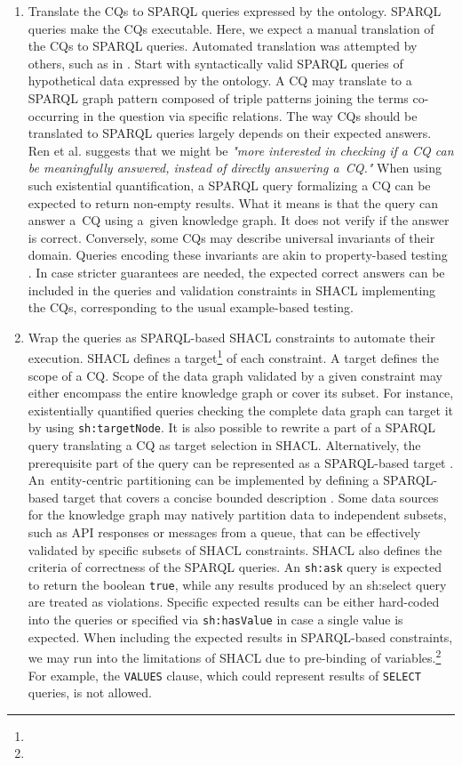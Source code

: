 \documentclass[
]{ceurart}
\begin{document}
\begin{enumerate}
    \item Translate the CQs to SPARQL queries expressed by the ontology. SPARQL queries make the CQs executable. Here, we expect a manual translation of the CQs to SPARQL queries. Automated translation was attempted by others, such as in \cite{EspinozaArias2022}. Start with syntactically valid SPARQL queries of hypothetical data expressed by the ontology. A CQ may translate to a SPARQL graph pattern composed of triple patterns joining the terms co-occurring in the question via specific relations. The way CQs should be translated to SPARQL queries largely depends on their expected answers. Ren et al. \cite{Ren2014} suggests that we might be \textit{"more interested in checking if a CQ can be meaningfully answered, instead of directly answering a~CQ."} When using such existential quantification, a SPARQL query formalizing a CQ can be expected to return non-empty results. What it means is that the query can answer a~CQ using a~given knowledge graph. It does not verify if the answer is correct. Conversely, some CQs may describe universal invariants of their domain. Queries encoding these invariants are akin to property-based testing \cite{Fink1997}. In case stricter guarantees are needed, the expected correct answers can be included in the queries and validation constraints in SHACL implementing the CQs, corresponding to the usual example-based testing.
    \item Wrap the queries as SPARQL-based SHACL constraints to automate their execution. SHACL defines a target\footnote{\urlshacltargets} of each constraint. A target defines the scope of a CQ. Scope of the data graph validated by a given constraint may either encompass the entire knowledge graph or cover its subset. For instance, existentially quantified queries checking the complete data graph can target it by using \texttt{sh:targetNode}. It is also possible to rewrite a part of a SPARQL query translating a CQ as target selection in SHACL. Alternatively, the prerequisite part of the query can be represented as a SPARQL-based target \cite{SHACLAF2017}. An~entity-centric partitioning can be implemented by defining a SPARQL-based target that covers a concise bounded description \cite{Stickler2005}. Some data sources for the knowledge graph may natively partition data to independent subsets, such as API responses or messages from a queue, that can be effectively validated by specific subsets of SHACL constraints. SHACL also defines the criteria of correctness of the SPARQL queries. An \texttt{sh:ask} query is expected to return the boolean \texttt{true}, while any results produced by an sh:select query are treated as violations. Specific expected results can be either hard-coded into the queries or specified via \texttt{sh:hasValue} in case a single value is expected. When including the expected results in SPARQL-based constraints, we may run into the limitations of SHACL due to pre-binding of variables.\footnote{\urlshaclprebinding} For example, the \texttt{VALUES} clause, which could represent results of \texttt{SELECT} queries, is not allowed.

\end{enumerate}
\end{document}
